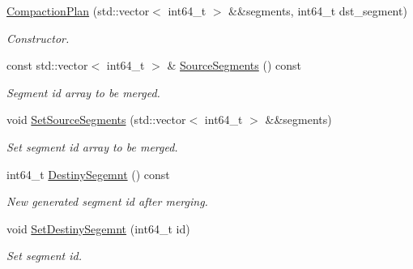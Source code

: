 \begin{DoxyCompactItemize}
\item 
\mbox{\label{classmilvus_1_1_compaction_plan_a71d0a329ce6789c3d989439aad07625b}} 
\hyperlink{classmilvus_1_1_compaction_plan_a71d0a329ce6789c3d989439aad07625b}{Compaction\+Plan} (std\+::vector$<$ int64\+\_\+t $>$ \&\&segments, int64\+\_\+t dst\+\_\+segment)
\begin{DoxyCompactList}\small\item\em Constructor. \end{DoxyCompactList}\item 
\mbox{\label{classmilvus_1_1_compaction_plan_a5a2bf812c105790f53859d3cbe503f49}} 
const std\+::vector$<$ int64\+\_\+t $>$ \& \hyperlink{classmilvus_1_1_compaction_plan_a5a2bf812c105790f53859d3cbe503f49}{Source\+Segments} () const
\begin{DoxyCompactList}\small\item\em Segment id array to be merged. \end{DoxyCompactList}\item 
\mbox{\label{classmilvus_1_1_compaction_plan_a2929a97a02802fe807c9a99b5758c625}} 
void \hyperlink{classmilvus_1_1_compaction_plan_a2929a97a02802fe807c9a99b5758c625}{Set\+Source\+Segments} (std\+::vector$<$ int64\+\_\+t $>$ \&\&segments)
\begin{DoxyCompactList}\small\item\em Set segment id array to be merged. \end{DoxyCompactList}\item 
\mbox{\label{classmilvus_1_1_compaction_plan_a0765051a47792bb18045190d5751998a}} 
int64\+\_\+t \hyperlink{classmilvus_1_1_compaction_plan_a0765051a47792bb18045190d5751998a}{Destiny\+Segemnt} () const
\begin{DoxyCompactList}\small\item\em New generated segment id after merging. \end{DoxyCompactList}\item 
\mbox{\label{classmilvus_1_1_compaction_plan_aa7e24bf3960613e661f0f281ba9ef298}} 
void \hyperlink{classmilvus_1_1_compaction_plan_aa7e24bf3960613e661f0f281ba9ef298}{Set\+Destiny\+Segemnt} (int64\+\_\+t id)
\begin{DoxyCompactList}\small\item\em Set segment id. \end{DoxyCompactList}\end{DoxyCompactItemize}


